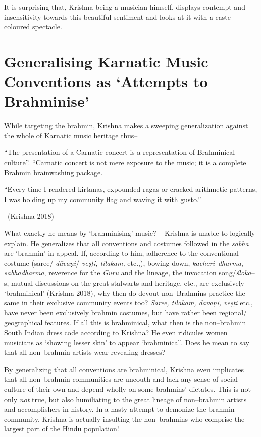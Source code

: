 It is surprising that, Krishna being a musician himself, displays contempt and insensitivity towards this beautiful sentiment and looks at it with a caste–coloured spectacle.

\vspace{-.4cm}

\section*{Generalising Karnatic Music Conventions as ‘Attempts to Brahminise’}

While targeting the brahmin, Krishna makes a sweeping generalization against the whole of Karnatic music heritage thus–

\begin{myquote}
“The presentation of a Carnatic concert is a representation of Brahminical culture”. “Carnatic concert is not mere exposure to the music; it is a complete Brahmin brainwashing package.
\end{myquote}

\begin{myquote}
“Every time I rendered kirtanas, expounded ragas or cracked arithmetic patterns, I was holding up my community flag and waving it with gusto.” 

~\hfill (Krishna 2018)
\end{myquote}

What exactly he means by ‘brahminising’ music? – Krishna is unable to logically explain. He generalizes that all conventions and costumes followed in the \textit{sabhā} are ‘brahmin’ in appeal. If, according to him, adherence to the conventional costume (saree/ \textit{dāvaṇi}/ \textit{veṣṭi, tilakam,} etc.,), bowing down, \textit{kacheri}–\textit{dharma}, \textit{sabhā}\textit{dharma}, reverence for the \textit{Guru} and the lineage, the invocation song/\textit{śloka}–s, mutual discussions on the great stalwarts and heritage, etc., are exclusively ‘brahminical’ (Krishna 2018), why then do devout non–Brahmins practice the same in their exclusive community events too? \textit{Saree, tilakam, dāvaṇi, veṣṭi} etc., have never been exclusively brahmin costumes, but have rather been regional/ geographical features. If all this is brahminical, what then is the non–brahmin South Indian dress code according to Krishna? He even ridicules women musicians as ‘showing lesser skin’ to appear ‘brahminical’. Does he mean to say that all non–brahmin artists wear revealing dresses?

By generalizing that all conventions are brahminical, Krishna even implicates that all non–brahmin communities are uncouth and lack any sense of social culture of their own and depend wholly on some brahmins’ dictates. This is not only \textit{not} true, but also humiliating to the great lineage of non–brahmin artists and accomplishers in history. In a hasty attempt to demonize the brahmin community, Krishna is actually insulting the non–brahmins who comprise the largest part of the Hindu population!

